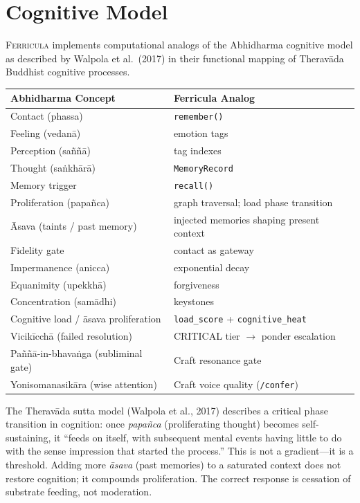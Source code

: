 \documentclass[twocolumn,10pt]{article}
\begin{document}
\section{Cognitive Model}

\textsc{Ferricula} implements computational analogs of the
Abhidharma cognitive model as described by Walpola et al.\ (2017)
in their functional mapping of Therav\=ada Buddhist cognitive
processes.

\begin{center}
\footnotesize
\begin{tabular}{ll}
\toprule
Abhidharma Concept & Ferricula Analog \\
\midrule
Contact (phassa) & \texttt{remember()} \\
Feeling (vedan\=a) & emotion tags \\
Perception (sa\~n\~n\=a) & tag indexes \\
Thought (sa\.nkh\=ar\=a) & \texttt{MemoryRecord} \\
Memory trigger & \texttt{recall()} \\
Proliferation (papa\~nca) & graph traversal; load phase transition \\
\=Asava (taints / past memory) & injected memories shaping present context \\
Fidelity gate & contact as gateway \\
Impermanence (anicca) & exponential decay \\
Equanimity (upekkh\=a) & forgiveness \\
Concentration (sam\=adhi) & keystones \\
Cognitive load / \=asava proliferation & \texttt{load\_score} + \texttt{cognitive\_heat} \\
Vicik\=icch\=a (failed resolution) & CRITICAL tier $\to$ ponder escalation \\
Pa\~n\~n\=a-in-bhava\.nga (subliminal gate) & Craft resonance gate \\
Yonisomanasik\=ara (wise attention) & Craft voice quality (\texttt{/confer}) \\
\bottomrule
\end{tabular}
\end{center}

\noindent
The Therav\=ada sutta model (Walpola et al., 2017) describes a critical
phase transition in cognition: once \textit{papa\~nca} (proliferating
thought) becomes self-sustaining, it ``feeds on itself, with subsequent
mental events having little to do with the sense impression that started
the process.''  This is not a gradient---it is a threshold.  Adding more
\textit{\=asava} (past memories) to a saturated context does not restore
cognition; it compounds proliferation.  The correct response is cessation
of substrate feeding, not moderation.
\end{document}
